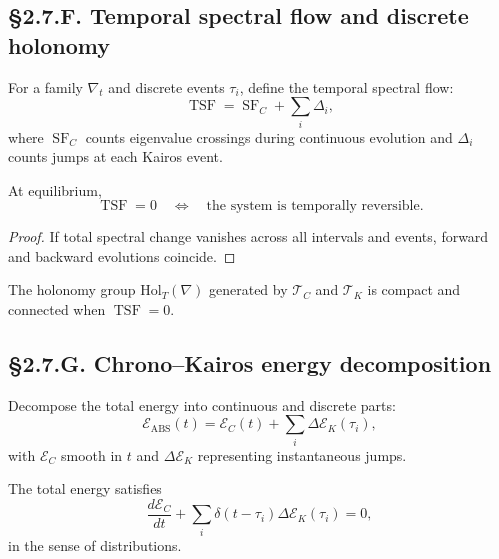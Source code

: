 \subsection*{§2.7.F. Temporal spectral flow and discrete holonomy}

\begin{definition}
For a family $\nabla_t$ and discrete events $\tau_i$, define the temporal spectral flow:
\[
\operatorname{TSF}=\operatorname{SF}_C + \sum_i \Delta_i,
\]
where $\operatorname{SF}_C$ counts eigenvalue crossings during continuous evolution and $\Delta_i$ counts jumps at each Kairos event.
\]
\end{definition}

\begin{theorem}\label{thm:2.7.index}
At equilibrium,
\[
\operatorname{TSF}=0 \quad\Longleftrightarrow\quad
\text{the system is temporally reversible.}
\]
\end{theorem}

\begin{proof}
If total spectral change vanishes across all intervals and events, forward and backward evolutions coincide.
\end{proof}

\begin{corollary}
The holonomy group $\mathrm{Hol}_T(\nabla)$ generated by $\mathcal{T}_C$ and $\mathcal{T}_K$ is compact and connected when $\operatorname{TSF}=0$.
\end{corollary}

\subsection*{§2.7.G. Chrono–Kairos energy decomposition}

\begin{definition}
Decompose the total energy into continuous and discrete parts:
\[
\mathcal{E}_{\mathrm{ABS}}(t)
=\mathcal{E}_C(t)+\sum_i \Delta\mathcal{E}_K(\tau_i),
\]
with $\mathcal{E}_C$ smooth in $t$ and $\Delta\mathcal{E}_K$ representing instantaneous jumps.
\]
\end{definition}

\begin{theorem}\label{thm:2.7.balance}
The total energy satisfies
\[
\frac{d\mathcal{E}_C}{dt}
+\sum_i\delta(t-\tau_i)\Delta\mathcal{E}_K(\tau_i)=0,
\]
in the sense of distributions.
\end{theorem}

